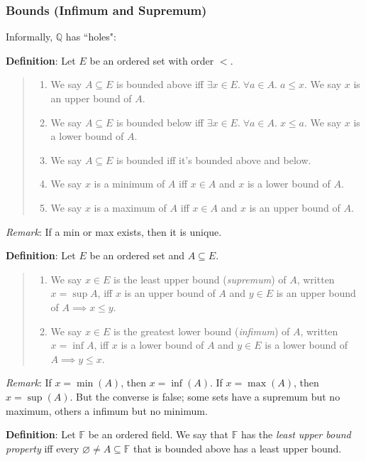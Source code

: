 \documentclass[11pt]{article}
\begin{document}
\subsubsection{Bounds (Infimum and Supremum)}

Informally, $\mathbb{Q}$ has ``holes":

\textbf{Definition}: Let $E$ be an ordered set with order $<$.
\begin{quote}\vspace{-0.3cm}
	\begin{enumerate}
	\item We say $A \subseteq E$ is bounded above iff $\exists x \in E.\; \forall a \in A.\; a \leq x$. We say $x$ is an upper bound of $A$.
	\item We say $A \subseteq E$ is bounded below iff $\exists x \in E.\; \forall a \in A.\; x \leq a$. We say $x$ is a lower bound of $A$.
	\item We say $A \subseteq E$ is bounded iff it's bounded above and below.
	\item We say $x$ is a minimum of $A$ iff $x \in A$ and $x$ is a lower bound of $A$.
	\item We say $x$ is a maximum of $A$ iff $x \in A$ and $x$ is an upper bound of $A$.
	\end{enumerate}
\end{quote}
\emph{Remark}: If a min or max exists, then it is unique.

\textbf{Definition}: Let $E$ be an ordered set and $A \subseteq E$.
\begin{quote}\vspace{-0.3cm}
	\begin{enumerate}
	\item We say $x \in E$ is the least upper bound (\emph{supremum}) of $A$, written $x = \sup A$, iff $x$ is an upper bound of $A$ and $y \in E$ is an upper bound of $A \implies x \leq y$.
	\item We say $x \in E$ is the greatest lower bound (\emph{infimum}) of $A$, written $x = \inf A$, iff $x$ is a lower bound of $A$ and $y \in E$ is a lower bound of $A \implies y \leq x$.
	\end{enumerate}
\end{quote}
\emph{Remark}: If $x = \min(A)$, then $x = \inf (A)$. If $x = \max(A)$, then $x = \sup (A)$. But the converse is false; some sets have a supremum but no maximum, others a infimum but no minimum.

\textbf{Definition}: Let $\mathbb{F}$ be an ordered field. We say that $\mathbb{F}$ has the \emph{least upper bound property} iff every $\varnothing \neq A \subseteq \mathbb{F}$ that is bounded above has a least upper bound.
\end{document}
